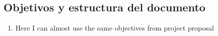 \subsection{Objetivos y estructura del documento}

\begin{enumerate}
  \item Here I can almost use the same objectives from project proposal
\end{enumerate}

